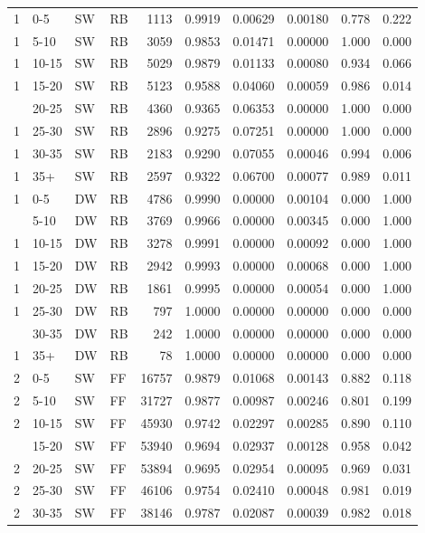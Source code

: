 \documentclass[
  11pt,
]{article}
\begin{document}
\begin{longtable}{llllrrrrrr}
1 & 0-5 & SW & RB & 1113 & 0.9919 & 0.00629 & 0.00180 & 0.778 & 0.222\\
1 & 5-10 & SW & RB & 3059 & 0.9853 & 0.01471 & 0.00000 & 1.000 & 0.000\\
1 & 10-15 & SW & RB & 5029 & 0.9879 & 0.01133 & 0.00080 & 0.934 & 0.066\\
1 & 15-20 & SW & RB & 5123 & 0.9588 & 0.04060 & 0.00059 & 0.986 & 0.014\\
\addlinespace
1 & 20-25 & SW & RB & 4360 & 0.9365 & 0.06353 & 0.00000 & 1.000 & 0.000\\
1 & 25-30 & SW & RB & 2896 & 0.9275 & 0.07251 & 0.00000 & 1.000 & 0.000\\
1 & 30-35 & SW & RB & 2183 & 0.9290 & 0.07055 & 0.00046 & 0.994 & 0.006\\
1 & 35+ & SW & RB & 2597 & 0.9322 & 0.06700 & 0.00077 & 0.989 & 0.011\\
1 & 0-5 & DW & RB & 4786 & 0.9990 & 0.00000 & 0.00104 & 0.000 & 1.000\\
\addlinespace
1 & 5-10 & DW & RB & 3769 & 0.9966 & 0.00000 & 0.00345 & 0.000 & 1.000\\
1 & 10-15 & DW & RB & 3278 & 0.9991 & 0.00000 & 0.00092 & 0.000 & 1.000\\
1 & 15-20 & DW & RB & 2942 & 0.9993 & 0.00000 & 0.00068 & 0.000 & 1.000\\
1 & 20-25 & DW & RB & 1861 & 0.9995 & 0.00000 & 0.00054 & 0.000 & 1.000\\
1 & 25-30 & DW & RB & 797 & 1.0000 & 0.00000 & 0.00000 & 0.000 & 0.000\\
\addlinespace
1 & 30-35 & DW & RB & 242 & 1.0000 & 0.00000 & 0.00000 & 0.000 & 0.000\\
1 & 35+ & DW & RB & 78 & 1.0000 & 0.00000 & 0.00000 & 0.000 & 0.000\\
2 & 0-5 & SW & FF & 16757 & 0.9879 & 0.01068 & 0.00143 & 0.882 & 0.118\\
2 & 5-10 & SW & FF & 31727 & 0.9877 & 0.00987 & 0.00246 & 0.801 & 0.199\\
2 & 10-15 & SW & FF & 45930 & 0.9742 & 0.02297 & 0.00285 & 0.890 & 0.110\\
\addlinespace
2 & 15-20 & SW & FF & 53940 & 0.9694 & 0.02937 & 0.00128 & 0.958 & 0.042\\
2 & 20-25 & SW & FF & 53894 & 0.9695 & 0.02954 & 0.00095 & 0.969 & 0.031\\
2 & 25-30 & SW & FF & 46106 & 0.9754 & 0.02410 & 0.00048 & 0.981 & 0.019\\
2 & 30-35 & SW & FF & 38146 & 0.9787 & 0.02087 & 0.00039 & 0.982 & 0.018\\

\end{longtable}
\end{document}
